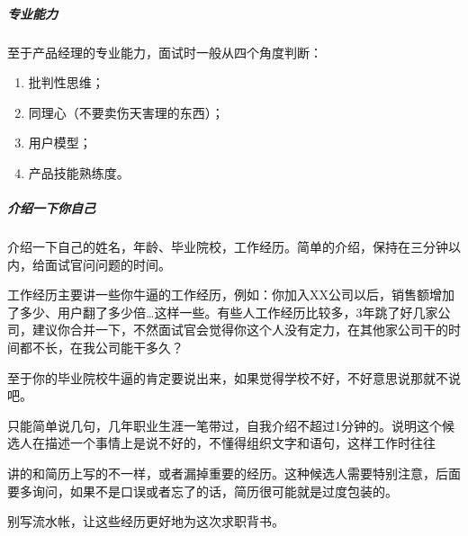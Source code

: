 \documentclass[letterpaper,10pt,english]{sphinxmanual}
\begin{document}
\subparagraph{专业能力}
\label{\detokenize{chapter_interview/question:id3}}
至于产品经理的专业能力，面试时一般从四个角度判断：
\begin{enumerate}
%
\item {} 
批判性思维；

\item {} 
同理心（不要卖伤天害理的东西）；

\item {} 
用户模型；

\item {} 
产品技能熟练度。

\end{enumerate}


\subparagraph{介绍一下你自己}
\label{\detokenize{chapter_interview/question:id4}}
介绍一下自己的姓名，年龄、毕业院校，工作经历。简单的介绍，保持在三分钟以内，给面试官问问题的时间。

工作经历主要讲一些你牛逼的工作经历，例如：你加入XX公司以后，销售额增加了多少、用户翻了多少倍…这样一些。有些人工作经历比较多，3年跳了好几家公司，建议你合并一下，不然面试官会觉得你这个人没有定力，在其他家公司干的时间都不长，在我公司能干多久？

至于你的毕业院校牛逼的肯定要说出来，如果觉得学校不好，不好意思说那就不说吧。

只能简单说几句，几年职业生涯一笔带过，自我介绍不超过1分钟的。说明这个候选人在描述一个事情上是说不好的，不懂得组织文字和语句，这样工作时往往%
\begin{footnote}[857]\sphinxAtStartFootnote
{}
%
\end{footnote}

讲的和简历上写的不一样，或者漏掉重要的经历。这种候选人需要特别注意，后面要多询问，如果不是口误或者忘了的话，简历很可能就是过度包装的。

别写流水帐，让这些经历更好地为这次求职背书。%
\begin{footnote}[858]\sphinxAtStartFootnote
{}
%
\end{footnote}
\end{document}
